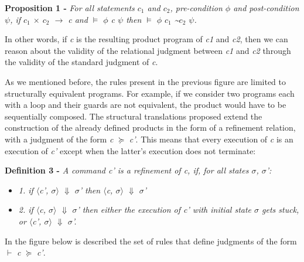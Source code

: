 \textbf{Proposition 1 -}  \emph{For all statements $c_1$ and $c_2$, pre-condition $\phi$ and post-condition $\psi$, if $c_1$ $\times$ $c_2$ $\rightarrow$ c and $\vDash$ {$\phi$} c {$\psi$} then $\vDash$ {$\phi$} $c_1$ \textasciitilde $c_2$ {$\psi$}.}

\bigskip
In other words, if \emph{c} is the resulting product program of \emph{c1} and \emph{c2}, then we can reason about the validity of the relational judgment between \emph{c1} and \emph{c2} through the validity of the standard judgment of \emph{c}.

As we mentioned before, the rules present in the previous figure are limited to structurally equivalent programs.
For example, if we consider two programs each with a loop and their guards are not equivalent, the product would have to be sequentially composed.
The structural translations proposed extend the construction of the already defined products in the form of a refinement relation, with a judgment of the form \emph{c} $\succcurlyeq$ \emph{c'}. 
This means that every execution of \emph{c} is an execution of \emph{c'} except when the latter's execution does not terminate:
\bigskip

\textbf{Definition 3 -}  \emph{A command c' is a refinement of c, if, for all states $\sigma$, $\sigma$':}    
\begin{itemize}
  \item{\emph{1. if $\langle$c', $\sigma$$\rangle$ $\Downarrow$ $\sigma$' then $\langle$c, $\sigma$$\rangle$ $\Downarrow$ $\sigma$'}}
  \vspace{-10pt}
  \item{\emph{2. if $\langle$c, $\sigma$$\rangle$ $\Downarrow$ $\sigma$' then either the execution of c' with initial state $\sigma$ gets stuck, or $\langle$c', $\sigma$$\rangle$ $\Downarrow$ $\sigma$'.}}
\end{itemize}

\bigskip
In the figure below is described the set of rules that define judgments of the form $\vdash$ \emph{c} $\succcurlyeq$ \emph{c'}.

